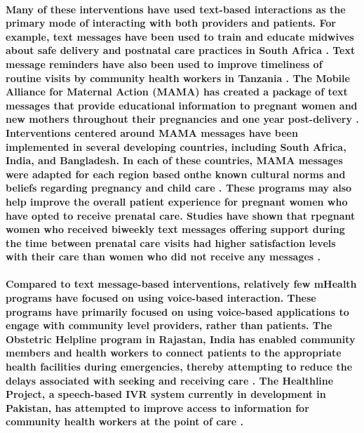 \paragraph{Many of these interventions have used text-based interactions as the primary mode of interacting with both providers and patients. For example, text messages have been used to train and educate midwives about safe delivery and postnatal care practices in South Africa \citep{Woods2012}. Text message reminders have also been used to improve timeliness of routine visits by community health workers in Tanzania \citep{DeRenzi2012}. The Mobile Alliance for Maternal Action (MAMA) has created a package of text messages that provide educational information to pregnant women and new mothers throughout their pregnancies and one year post-delivery \citep{MAMA}. Interventions centered around MAMA messages have been implemented in several developing countries, including South Africa, India, and Bangladesh. In each of these countries, MAMA messages were adapted for each region based onthe known cultural norms and beliefs regarding pregnancy and child care \citep{McCartney2012}. These programs may also help improve the overall patient experience for pregnant women who have opted to receive prenatal care. Studies have shown that rpegnant women who received biweekly text messages offering support during the time between prenatal care visits had higher satisfaction levels with their care than women who did not receive any messages \citep{Jareethum2008}.}

\paragraph{Compared to text message-based interventions, relatively few mHealth programs have focused on using voice-based interaction. These programs have primarily focused on using voice-based applications to engage with community level providers, rather than patients. The Obstetric Helpline program in Rajastan, India has enabled community members and health workers to connect patients to the appropriate health facilities during emergencies, thereby attempting to reduce the delays associated with seeking and receiving care \citep{UNICEF2008}.  The Healthline Project, a speech-based IVR system currently in development in Pakistan, has attempted to improve access to information for community health workers at the point of care \citep{Sherwani2007}.}

